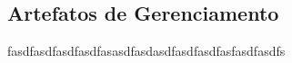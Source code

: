 \begin{anexosenv}

\partanexos

\chapter{Artefatos de Gerenciamento}\label{cap3}

fasdfasdfasdfasdfasasdfasdasdfasdfasdfasfasdfasdfs

\end{anexosenv}

